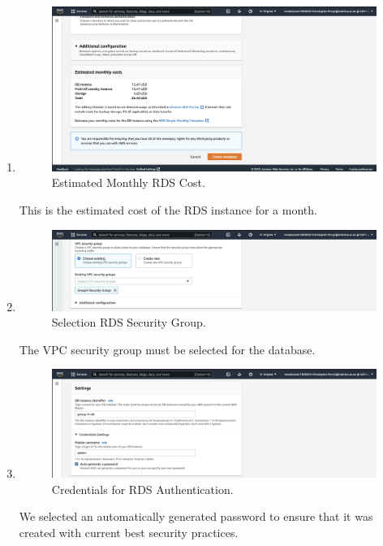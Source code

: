 \begin{enumerate}
    \item
    \begin{figure}[H]
        \centering
        \includegraphics[width=\textwidth]{resources/rds/rds-monthly-costs}
        \caption{Estimated Monthly RDS Cost.}
        \label{fig:rds-costs}
    \end{figure}
    This is the estimated cost of the RDS instance for a month.

    \item
    \begin{figure}[H]
        \centering
        \includegraphics[width=\textwidth]{resources/rds/rds-security-group}
        \caption{Selection RDS Security Group.}
        \label{fig:rds-security}
    \end{figure}
    The VPC security group must be selected for the database.

    \item
    \begin{figure}[H]
        \centering
        \includegraphics[width=\textwidth]{resources/rds/rds-settings}
        \caption{Credentials for RDS Authentication.}
        \label{fig:rds-settings}
    \end{figure}
    We selected an automatically generated password to ensure that it was created with current best security practices.


\end{enumerate}
